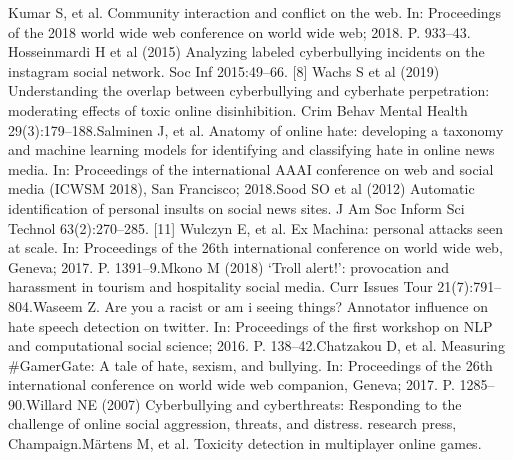 \documentclass{letter}
\begin{document}
\begin{multicols}{2}
\begin{scriptsize}
[6] Kumar S, et al. Community interaction and conflict on the web. 
In: Proceedings of the 2018 world wide web conference on world 
wide web; 2018. P. 933–43. \newline \newline
[7] Hosseinmardi H et al (2015) Analyzing labeled cyberbullying 
incidents on the instagram social network. Soc Inf 2015:49–66.
[8] Wachs S et al (2019) Understanding the overlap between 
cyberbullying and cyberhate perpetration: moderating effects of 
toxic online disinhibition. Crim Behav Mental Health 
29(3):179–188.\newline \newline
[9] Salminen J, et al. Anatomy of online hate: developing a 
taxonomy and machine learning models for identifying and 
classifying hate in online news media. In: Proceedings of the 
international AAAI conference on web and social media 
(ICWSM 2018), San Francisco; 2018.\newline \newline
[10] Sood SO et al (2012) Automatic identification of personal insults 
on social news sites. J Am Soc Inform Sci Technol 63(2):270–285.
[11] Wulczyn E, et al. Ex Machina: personal attacks seen at scale. In: 
Proceedings of the 26th international conference on world wide 
web, Geneva; 2017. P. 1391–9.\newline \newline
[12] Mkono M (2018) ‘Troll alert!’: provocation and harassment in 
tourism and hospitality social media. Curr Issues Tour 
21(7):791–804.\newline \newline
[13] Waseem Z. Are you a racist or am i seeing things? Annotator 
influence on hate speech detection on twitter. In: Proceedings of 
the first workshop on NLP and computational social science; 
2016. P. 138–42.\newline \newline
[14] Chatzakou D, et al. Measuring \#GamerGate: A tale of hate, 
sexism, and bullying. In: Proceedings of the 26th international 
conference on world wide web companion, Geneva; 2017. P. 
1285–90.\newline \newline
[15] Willard NE (2007) Cyberbullying and cyberthreats: Responding 
to the challenge of online social aggression, threats, and distress. 
research press, Champaign.\newline \newline
[16] Märtens M, et al. Toxicity detection in multiplayer online games. 

\end{scriptsize}
\end{multicols}
\end{document}
